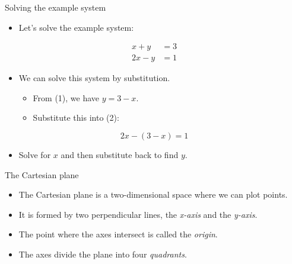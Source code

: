 \documentclass[
  10pt,
  ignorenonframetext,
]{beamer}
\providecommand{\tightlist}{%
  \setlength{\itemsep}{0pt}\setlength{\parskip}{0pt}}\usepackage{longtable,booktabs,array}
\begin{document}
\begin{frame}{Solving the example system}
\label{solving-the-example-system}
\begin{itemize}
\tightlist
\item
  Let's solve the example system:
\end{itemize}

\begin{align*}
x + y &= 3 \\
2x - y &= 1
\end{align*}

\begin{itemize}
\tightlist
\item
  We can solve this system by substitution.

  \begin{itemize}
  \tightlist
  \item
    From (1), we have \(y = 3 - x\).
  \item
    Substitute this into (2):
  \end{itemize}
\end{itemize}

\[2x - (3 - x) = 1\]

\begin{itemize}
\tightlist
\item
  Solve for \(x\) and then substitute back to find \(y\).
\end{itemize}
\end{frame}

\begin{frame}{The Cartesian plane}
\label{the-cartesian-plane}
\begin{itemize}
\item
  The Cartesian plane is a two-dimensional space where we can plot
  points.
\item
  It is formed by two perpendicular lines, the \emph{x-axis} and the
  \emph{y-axis}.
\item
  The point where the axes intersect is called the \emph{origin}.
\item
  The axes divide the plane into four \emph{quadrants}.
\end{itemize}
\end{frame}
\end{document}
